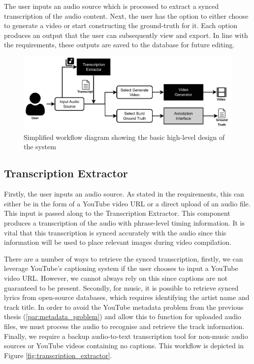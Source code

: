 \documentclass{l4proj}
\begin{document}
The user inputs an audio source which is processed to extract a synced transcription of the audio content. Next, the user has the option to either choose to generate a video or start constructing the ground-truth for it. Each option produces an output that the user can subsequently view and export. In line with the requirements, these outputs are saved to the database for future editing.

\begin{figure}[h]
    \centering
    \includegraphics[width=1\textwidth]{figures/simplified_architecture.pdf}
    \caption{Simplified workflow diagram showing the basic high-level design of the system}
    \label{fig:simplified_workflow}
\end{figure}

\subsection{Transcription Extractor}
Firstly, the user inputs an audio source. As stated in the requirements, this can either be in the form of a YouTube video URL or a direct upload of an audio file. This input is passed along to the Transcription Extractor. This component produces a transcription of the audio with phrase-level timing information. It is vital that this transcription is synced accurately with the audio since this information will be used to place relevant images during video compilation.

There are a number of ways to retrieve the synced transcription, firstly, we can leverage YouTube's captioning system if the user chooses to input a YouTube video URL. However, we cannot always rely on this since captions are not guaranteed to be present. Secondly, for music, it is possible to retrieve synced lyrics from open-source databases, which requires identifying the artist name and track title. In order to avoid the YouTube metadata problem from the previous thesis (\ref{par:metadata_problem}) and allow this to function for uploaded audio files, we must process the audio to recognise and retrieve the track information. Finally, we require a backup audio-to-text transcription tool for non-music audio sources or YouTube videos containing no captions. This workflow is depicted in Figure \ref{fig:transcription_extractor}.
\end{document}
